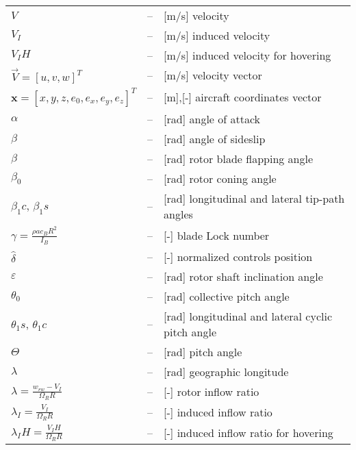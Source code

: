 \begin{longtable}[l]{ l l p{} }
  $V$                                                    & -- & [m/s] velocity \\
  $V_I$                                                  & -- & [m/s] induced velocity \\
  $V_IH$                                                 & -- & [m/s] induced velocity for hovering \\
  $\vec V=\left[ u, v, w \right]^T$                      & -- & [m/s] velocity vector \\
  $\boldsymbol x=\left[ x,y,z,e_0,e_x,e_y,e_z \right]^T$ & -- & [m],[-] aircraft coordinates vector \\
  $\alpha$                                               & -- & [rad] angle of attack \\
  $\beta$                                                & -- & [rad] angle of sideslip \\
  $\beta$                                                & -- & [rad] rotor blade flapping angle \\
  $\beta_0$                                              & -- & [rad] rotor coning angle \\
  $\beta_1c$, $\beta_1s$                                 & -- & [rad] longitudinal and lateral tip-path angles \\
  $\gamma=\frac{\rho a c_B R^2}{I_B}$                    & -- & [-] blade Lock number \\
  $\hat \delta$                                          & -- & [-] normalized controls position \\
  $\varepsilon$                                          & -- & [rad] rotor shaft inclination angle \\
  $\theta_0$                                             & -- & [rad] collective pitch angle \\
  $\theta_1s$, $\theta_1c$                               & -- & [rad] longitudinal and lateral cyclic pitch angle \\
  $\Theta$                                               & -- & [rad] pitch angle \\
  $\lambda$                                              & -- & [rad] geographic longitude \\
  $\lambda=\frac{w_{rw} - V_I}{\Omega_R R}$              & -- & [-] rotor inflow ratio \\
  $\lambda_I=\frac{V_I}{\Omega_R R}$                     & -- & [-] induced inflow ratio \\
  $\lambda_IH=\frac{V_IH}{\Omega_R R}$                   & -- & [-] induced inflow ratio for hovering \\

\end{longtable}
